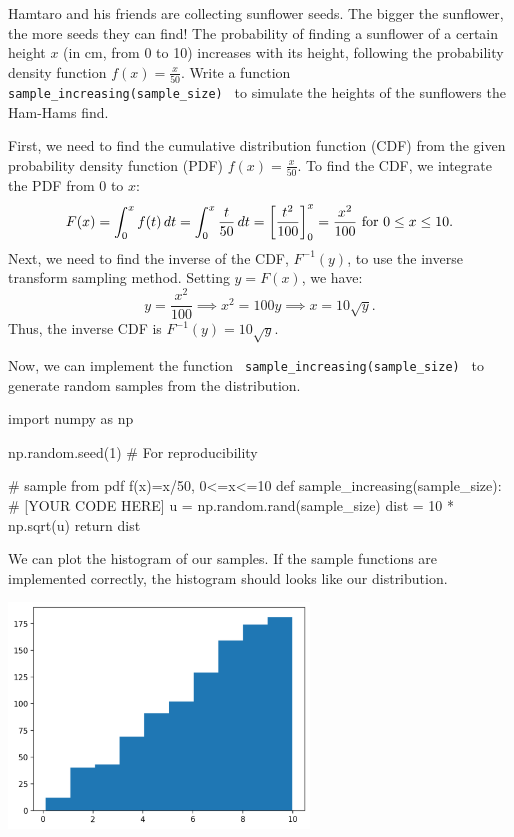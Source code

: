 \documentclass[a4paper, 10pt]{article}
\begin{document}
\begin{tosubmit}
Hamtaro and his friends are collecting sunflower seeds. The bigger the sunflower, the more seeds they can find!
The probability of finding a sunflower of a certain height \( x \) (in cm, from 0 to 10) increases with its height, following the probability density function \( f(x)= \frac{x}{50} \).
Write a function \texttt{ sample\_increasing(sample\_size) } to simulate the heights of the sunflowers the Ham-Hams find.

\vspace{5mm}

\par\noindent\submitsolution
First, we need to find the cumulative distribution function (CDF) from the given probability density function (PDF) \( f(x) = \frac{x}{50} \).
To find the CDF, we integrate the PDF from 0 to \( x \):
\[
    F(x) = \int_0^x f(t) \, dt = \int_0^x \frac{t}{50} \, dt = \left[ \frac{t^2}{100} \right]_0^x = \frac{x^2}{100} \text{ for } 0 \leq x \leq 10.
\]
Next, we need to find the inverse of the CDF, \( F^{-1}(y) \), to use the inverse transform sampling method.
Setting \( y = F(x) \), we have:
\[
    y = \frac{x^2}{100} \implies x^2 = 100y \implies x = 10\sqrt{y}.
\]
Thus, the inverse CDF is \( F^{-1}(y) = 10\sqrt{y} \).

Now, we can implement the function \texttt{ sample\_increasing(sample\_size) } to generate random samples from the distribution.
\begin{codingbox}
import numpy as np

np.random.seed(1)  # For reproducibility

# sample from pdf f(x)=x/50, 0<=x<=10
def sample_increasing(sample_size):
  # [YOUR CODE HERE]
  u = np.random.rand(sample_size)
  dist = 10 * np.sqrt(u)
  return dist
\end{codingbox}

We can plot the histogram of our samples.
If the sample functions are implemented correctly, the histogram should looks like our distribution.
\begin{center}
    \includegraphics[width=0.6\textwidth]{images/sampling_increasing.png}
\end{center}
\end{tosubmit}
\end{document}
